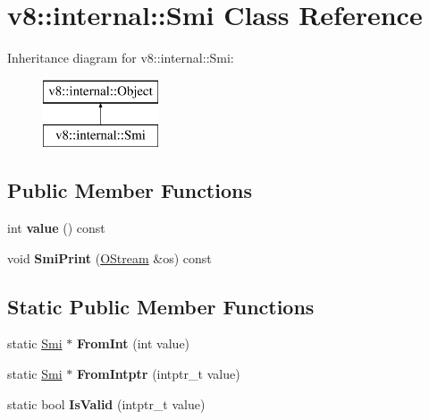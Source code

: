 \hypertarget{classv8_1_1internal_1_1_smi}{}\section{v8\+:\+:internal\+:\+:Smi Class Reference}
\label{classv8_1_1internal_1_1_smi}
Inheritance diagram for v8\+:\+:internal\+:\+:Smi\+:\begin{figure}[H]
\begin{center}
\leavevmode
\includegraphics[height=2.000000cm]{classv8_1_1internal_1_1_smi}
\end{center}
\end{figure}
\subsection*{Public Member Functions}
\begin{DoxyCompactItemize}
\item 
\hypertarget{classv8_1_1internal_1_1_smi_a524bdb2a995328dbaf74f29138834584}{}int {\bfseries value} () const \label{classv8_1_1internal_1_1_smi_a524bdb2a995328dbaf74f29138834584}

\item 
\hypertarget{classv8_1_1internal_1_1_smi_a3c0472b8a9b89ce071e1138b18284c62}{}void {\bfseries Smi\+Print} (\hyperlink{classv8_1_1internal_1_1_o_stream}{O\+Stream} \&os) const \label{classv8_1_1internal_1_1_smi_a3c0472b8a9b89ce071e1138b18284c62}

\end{DoxyCompactItemize}
\subsection*{Static Public Member Functions}
\begin{DoxyCompactItemize}
\item 
\hypertarget{classv8_1_1internal_1_1_smi_ab8a06699d9e96c9c50be9bf54c29ea86}{}static \hyperlink{classv8_1_1internal_1_1_smi}{Smi} $\ast$ {\bfseries From\+Int} (int value)\label{classv8_1_1internal_1_1_smi_ab8a06699d9e96c9c50be9bf54c29ea86}

\item 
\hypertarget{classv8_1_1internal_1_1_smi_acb298fe8360fe3fedcadbdf1cf73f98f}{}static \hyperlink{classv8_1_1internal_1_1_smi}{Smi} $\ast$ {\bfseries From\+Intptr} (intptr\+\_\+t value)\label{classv8_1_1internal_1_1_smi_acb298fe8360fe3fedcadbdf1cf73f98f}

\item 
\hypertarget{classv8_1_1internal_1_1_smi_adffa6d4355e3788451eb340ff5013f73}{}static bool {\bfseries Is\+Valid} (intptr\+\_\+t value)\label{classv8_1_1internal_1_1_smi_adffa6d4355e3788451eb340ff5013f73}

\end{DoxyCompactItemize}
